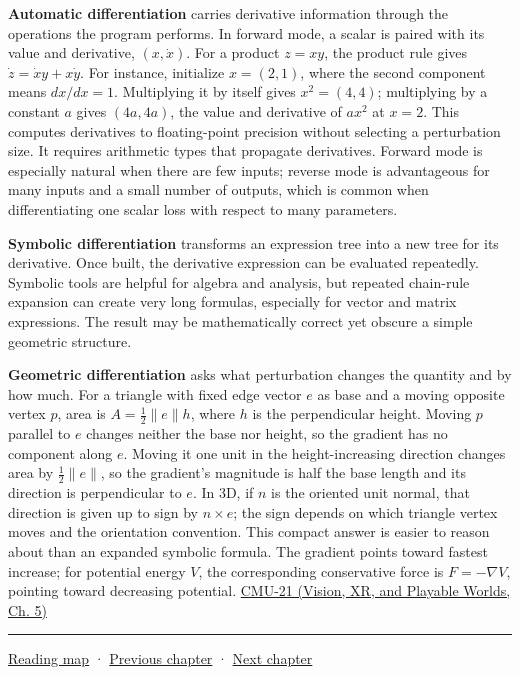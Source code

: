 \textbf{Automatic differentiation} carries derivative information through the operations the program performs. In forward mode, a scalar is paired with its value and derivative, \((x,\dot x)\). For a product \(z=xy\), the product rule gives \(\dot z=\dot x y+x\dot y\). For instance, initialize \(x=(2,1)\), where the second component means \(dx/dx=1\). Multiplying it by itself gives \(x^2=(4,4)\); multiplying by a constant \(a\) gives \((4a,4a)\), the value and derivative of \(ax^2\) at \(x=2\). This computes derivatives to floating-point precision without selecting a perturbation size. It requires arithmetic types that propagate derivatives. Forward mode is especially natural when there are few inputs; reverse mode is advantageous for many inputs and a small number of outputs, which is common when differentiating one scalar loss with respect to many parameters.

\textbf{Symbolic differentiation} transforms an expression tree into a new tree for its derivative. Once built, the derivative expression can be evaluated repeatedly. Symbolic tools are helpful for algebra and analysis, but repeated chain-rule expansion can create very long formulas, especially for vector and matrix expressions. The result may be mathematically correct yet obscure a simple geometric structure.

\textbf{Geometric differentiation} asks what perturbation changes the quantity and by how much. For a triangle with fixed edge vector \(e\) as base and a moving opposite vertex \(p\), area is \(A=\tfrac12\|e\|h\), where \(h\) is the perpendicular height. Moving \(p\) parallel to \(e\) changes neither the base nor height, so the gradient has no component along \(e\). Moving it one unit in the height-increasing direction changes area by \(\tfrac12\|e\|\), so the gradient's magnitude is half the base length and its direction is perpendicular to \(e\). In 3D, if \(n\) is the oriented unit normal, that direction is given up to sign by \(n\times e\); the sign depends on which triangle vertex moves and the orientation convention. This compact answer is easier to reason about than an expanded symbolic formula. The gradient points toward fastest increase; for potential energy \(V\), the corresponding conservative force is \(F=-\nabla V\), pointing toward decreasing potential. \href{../07-Vision-XR-and-Playable-Worlds/main.pdf\#nameddest=04-visual-computing-ii-ch036-cmu-21---dynamics-and-time-integration}{CMU-21 (Vision, XR, and Playable Worlds, Ch. 5)}

\begin{center}\rule{0.5\linewidth}{0.5pt}\end{center}

\hyperref[volume-reading-map]{Reading map} · \hyperref[04-visual-computing-ii-ch028-visibility-queries-and-ray-intersections]{Previous chapter} · \hyperref[04-visual-computing-ii-ch030-mesh-operators-boundaries-and-diffusion]{Next chapter}
